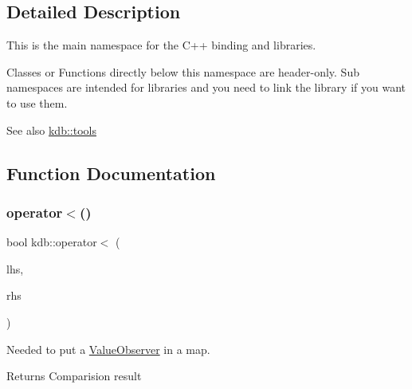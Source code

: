 \subsection{Detailed Description}
This is the main namespace for the C++ binding and libraries. 

Classes or Functions directly below this namespace are header-\/only. Sub namespaces are intended for libraries and you need to link the library if you want to use them.
\begin{DoxyItemize}
\item \begin{DoxySeeAlso}{See also}
\hyperlink{namespacekdb_1_1tools}{kdb\+::tools} 
\end{DoxySeeAlso}

\end{DoxyItemize}

\subsection{Function Documentation}
\mbox{\label{namespacekdb_a53a162c7ff73150a3f6e6ab9d191aab0}} 
\subsubsection{\texorpdfstring{operator$<$()}{operator<()}}
{\footnotesize\ttfamily bool kdb\+::operator$<$ (\begin{DoxyParamCaption}\item[{\hyperlink{classkdb_1_1ValueObserver}{Value\+Observer} const \&}]{lhs,  }\item[{\hyperlink{classkdb_1_1ValueObserver}{Value\+Observer} const \&}]{rhs }\end{DoxyParamCaption})\hspace{0.3cm}{\ttfamily [inline]}}



Needed to put a \hyperlink{classkdb_1_1ValueObserver}{Value\+Observer} in a map. 

\begin{DoxyReturn}{Returns}
Comparision result 
\end{DoxyReturn}
\mbox{\label{namespacekdb_ac004b5ba79154cbba02d5e5d83337e47}} 
